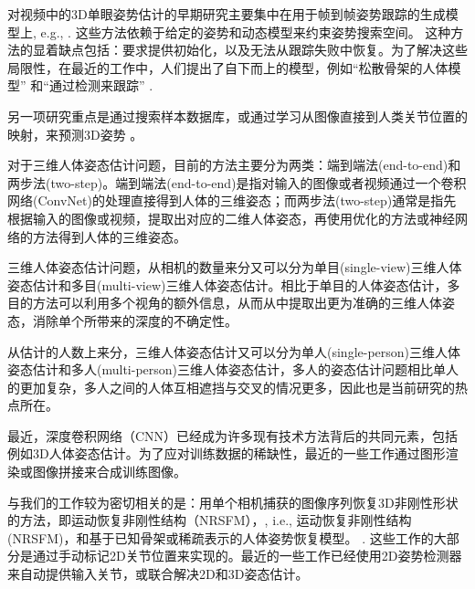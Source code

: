 \begin{refsection}
对视频中的3D单眼姿势估计的早期研究主要集中在用于帧到帧姿势跟踪的生成模型上, e.g.,  \cite{bregler1998tracking,sminchisescu2003kinematic}. 
这些方法依赖于给定的姿势和动态模型来约束姿势搜索空间。
这种方法的显着缺点包括：要求提供初始化，以及无法从跟踪失败中恢复。为了解决这些局限性，在最近的工作中，人们提出了自下而上的模型，例如``松散骨架的人体模型'' \cite{sigal2012loose} 和``通过检测来跟踪'' \cite{andriluka2010monocular}.

另一项研究重点是通过搜索样本数据库\cite{shakhnarovich2003fast,mori2006recovering,jiang20103d,yasin2016dual}，或通过学习从图像直接到人类关节位置的映射，来预测3D姿势 \cite{agarwal2006recovering,bo2010twin,salzmann2010implicitly,yu2013unconstrained,ionescu2014human,kostrikov2014depth}。

对于三维人体姿态估计问题，目前的方法主要分为两类：端到端法(end-to-end)\autocite{pavlakos2017coarse}和两步法(two-step)\autocite{zhou2016sparseness}。端到端法(end-to-end)\autocite{pavlakos2017coarse}是指对输入的图像或者视频通过一个卷积网络(ConvNet)的处理直接得到人体的三维姿态；而两步法(two-step)\autocite{zhou2016sparseness}通常是指先根据输入的图像或视频，提取出对应的二维人体姿态，再使用优化的方法或神经网络的方法得到人体的三维姿态。

三维人体姿态估计问题，从相机的数量来分又可以分为单目(single-view)三维人体姿态估计和多目(multi-view)三维人体姿态估计。相比于单目的人体姿态估计，多目的方法可以利用多个视角的额外信息，从而从中提取出更为准确的三维人体姿态，消除单个所带来的深度的不确定性。

从估计的人数上来分，三维人体姿态估计又可以分为单人(single-person)三维人体姿态估计和多人(multi-person)三维人体姿态估计，多人的姿态估计问题相比单人的更加复杂，多人之间的人体互相遮挡与交叉的情况更多，因此也是当前研究的热点所在。


最近，深度卷积网络（CNN）已经成为许多现有技术方法背后的共同元素，包括例如3D人体姿态估计\cite{li20143d,li2015,tekin2015,du2016marker,park20163d,zhou2016deep}。为了应对训练数据的稀缺性，最近的一些工作通过图形渲染\cite{chen2016synthesizing}或图像拼接\cite{rogez2016mocap}来合成训练图像。 

与我们的工作较为密切相关的是：用单个相机捕获的图像序列恢复3D非刚性形状的方法，即运动恢复非刚性结构（NRSFM），\cite{bregler2000recovering,akhter2011trajectory,dai2012simple,zhu2014complex,cho2015complex}, i.e., 运动恢复非刚性结构 (NRSFM)，和基于已知骨架\cite{lee1985determination,taylor2000reconstruction,valmadre2010deterministic,park20113d,radwan2013monocular,leonardos2016articulated}或稀疏表示的人体姿势恢复模型。 \cite{ramakrishna2012reconstructing,fan2014pose,akhter2015pose,zhou20153d,zhou2015sparse}. 这些工作的大部分是通过手动标记2D关节位置来实现的。最近的一些工作已经使用2D姿势检测器来自动提供输入关节\cite{simo2012single,wang2014robust}，或联合解决2D和3D姿态估计\cite{simo2013joint,zhou2014spatio}。


\end{refsection}
